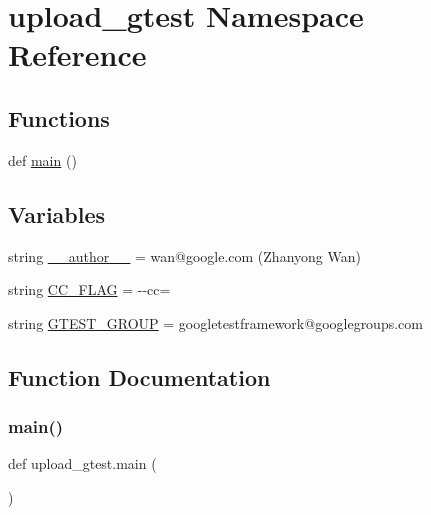 \hypertarget{namespaceupload__gtest}{}\section{upload\+\_\+gtest Namespace Reference}
\label{namespaceupload__gtest}
\subsection*{Functions}
\begin{DoxyCompactItemize}
\item 
def \hyperlink{namespaceupload__gtest_ab5bef7b968c54c632a52c1b4a3d37bdd}{main} ()
\end{DoxyCompactItemize}
\subsection*{Variables}
\begin{DoxyCompactItemize}
\item 
string \hyperlink{namespaceupload__gtest_ae7f6ee6ec8f85faa6fb72465afce7c0d}{\+\_\+\+\_\+author\+\_\+\+\_\+} = \textquotesingle{}wan@google.\+com (Zhanyong Wan)\textquotesingle{}
\item 
string \hyperlink{namespaceupload__gtest_a83f0946f9ee3731253fc622acd581fc2}{C\+C\+\_\+\+F\+L\+AG} = \textquotesingle{}-\/-\/cc=\textquotesingle{}
\item 
string \hyperlink{namespaceupload__gtest_af282f4c60bf6069ed0abf4e06d9b70ab}{G\+T\+E\+S\+T\+\_\+\+G\+R\+O\+UP} = \textquotesingle{}googletestframework@googlegroups.\+com\textquotesingle{}
\end{DoxyCompactItemize}


\subsection{Function Documentation}
\mbox{\label{namespaceupload__gtest_ab5bef7b968c54c632a52c1b4a3d37bdd}} 
\subsubsection{\texorpdfstring{main()}{main()}}
{\footnotesize\ttfamily def upload\+\_\+gtest.\+main (\begin{DoxyParamCaption}{ }\end{DoxyParamCaption})}



